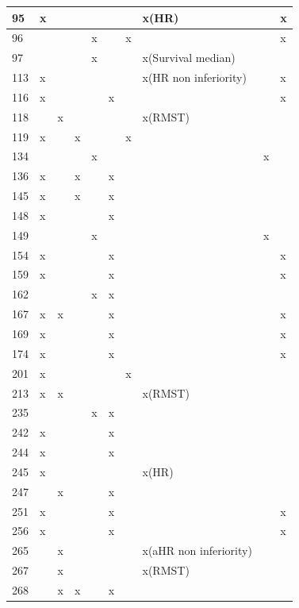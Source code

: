 \begin{landscape}
\begin{longtable}{|p{0.3in}|p{0.4in}|p{0.4in}|p{0.4in}|p{0.3in}|p{0.4in}|p{0.4in}|p{1.0in}|p{0.65in}|p{0.8in}|}
95 & x &  &  &  &  &  & x(HR) &  & x \\ \hline 
96 &  &  &  & x &  & x &  &  & x \\ \hline 
97 &  &  &  & x &  &  & x(Survival median) &  &  \\ \hline 
113 & x &  &  &  &  &  & x(HR non inferiority) &  & x \\ \hline 
116 & x &  &  &  & x &  &  &  & x \\ \hline 
118 &  & x &  &  &  &  & x(RMST) &  &  \\ \hline 
119 & x &  & x &  &  & x &  &  &  \\ \hline 
134 &  &  &  & x &  &  &  & x &  \\ \hline 
136 & x &  & x &  & x &  &  &  &  \\ \hline 
145 & x &  & x &  & x &  &  &  &  \\ \hline 
148 & x &  &  &  & x &  &  &  &  \\ \hline 
149 &  &  &  & x &  &  &  & x &  \\ \hline 
154 & x &  &  &  & x &  &  &  & x \\ \hline 
159 & x &  &  &  & x &  &  &  & x \\ \hline 
162 &  &  &  & x & x &  &  &  &  \\ \hline 
167 & x & x &  &  & x &  &  &  & x \\ \hline 
169 & x &  &  &  & x &  &  &  & x \\ \hline 
174 & x &  &  &  & x &  &  &  & x \\ \hline 
201 & x &  &  &  &  & x &  &  &  \\ \hline 
213 & x & x &  &  &  &  & x(RMST) &  &  \\ \hline 
235 &  &  &  & x & x &  &  &  &  \\ \hline 
242 & x &  &  &  & x &  &  &  &  \\ \hline 
244 & x &  &  &  & x &  &  &  &  \\ \hline 
245 & x &  &  &  &  &  & x(HR) &  &  \\ \hline 
247 &  & x &  &  & x &  &  &  &  \\ \hline 
251 & x &  &  &  & x &  &  &  & x \\ \hline 
256 & x &  &  &  & x &  &  &  & x \\ \hline 
265 &  & x &  &  &  &  & x(aHR non inferiority) &  &  \\ \hline 
267 &  & x &  &  &  &  & x(RMST) &  &  \\ \hline 
268 &  & x & x &  & x &  &  &  &  \\ \hline 

\end{longtable}
\end{landscape}
